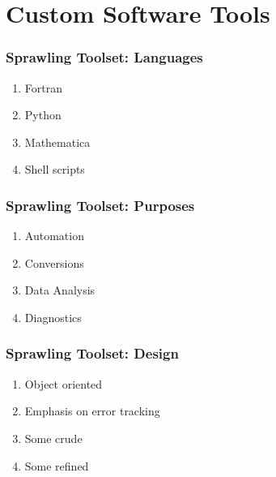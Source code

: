 % 

\section{Custom Software Tools}
\begin{frame}\frametitle{Sprawling Toolset: Languages}
\begin{enumerate}
	\item Fortran
	\item Python
	\item Mathematica
	\item Shell scripts
\end{enumerate}
\end{frame}

\begin{frame}\frametitle{Sprawling Toolset: Purposes}
\begin{enumerate}
	\item Automation
	\item Conversions
	\item Data Analysis
	\item Diagnostics
\end{enumerate}
\end{frame}

\begin{frame}\frametitle{Sprawling Toolset: Design}
\begin{enumerate}
	\item Object oriented
	\item Emphasis on error tracking
	\item Some crude
	\item Some refined
\end{enumerate}
\end{frame}


	
	
	
	


\endinput  %